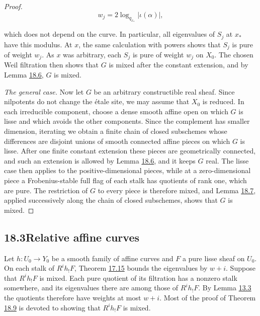 \documentclass[11pt]{article}
\begin{document}
\begin{proof}[{Proof}]
\[
w_j=2\log_{q_{x_*}}|\iota(\alpha)|,
\]

which does not depend on the curve. In particular, all eigenvalues of \(S_j\) at \(x_*\) have this modulus. At \(x\), the same calculation with powers shows that \(S_j\) is pure of weight \(w_j\). As \(x\) was arbitrary, each \(S_j\) is pure of weight \(w_j\) on \(X_0\). The chosen Weil filtration then shows that \(G\) is mixed after the constant extension, and by Lemma \hyperref[bp291]{18.6}, \(G\) is mixed.

\emph{The general case.} Now let \(G\) be an arbitrary constructible real sheaf. Since nilpotents do not change the étale site, we may assume that \(X_0\) is reduced. In each irreducible component, choose a dense smooth affine open on which \(G\) is lisse and which avoids the other components. Since the complement has smaller dimension, iterating we obtain a finite chain of closed subschemes whose differences are disjoint unions of smooth connected affine pieces on which \(G\) is lisse. After one finite constant extension these pieces are geometrically connected, and such an extension is allowed by Lemma \hyperref[bp291]{18.6}, and it keeps \(G\) real. The lisse case then applies to the positive-dimensional pieces, while at a zero-dimensional piece a Frobenius-stable full flag of each stalk has quotients of rank one, which are pure. The restriction of \(G\) to every piece is therefore mixed, and Lemma \hyperref[bp293]{18.7}, applied successively along the chain of closed subschemes, shows that \(G\) is mixed.
\end{proof}


\subsection*{\texorpdfstring{18.3\quad Relative affine curves}{18.3 Relative affine curves}}
\label{bp297}%
\label{bp298}%
Let \(h:U_0\to Y_0\) be a smooth family of affine curves and \(F\) a pure lisse sheaf on \(U_0\). On each stalk of \(R^ih_!F\), Theorem \hyperref[bp269]{17.15} bounds the eigenvalues by \(w+i\). Suppose that \(R^ih_!F\) is mixed. Each pure quotient of its filtration has a nonzero stalk somewhere, and its eigenvalues there are among those of \(R^ih_!F\). By Lemma \hyperref[bp14]{13.3} the quotients therefore have weights at most \(w+i\). Most of the proof of Theorem \hyperref[bp299]{18.9} is devoted to showing that \(R^ih_!F\) is mixed.
\end{document}
